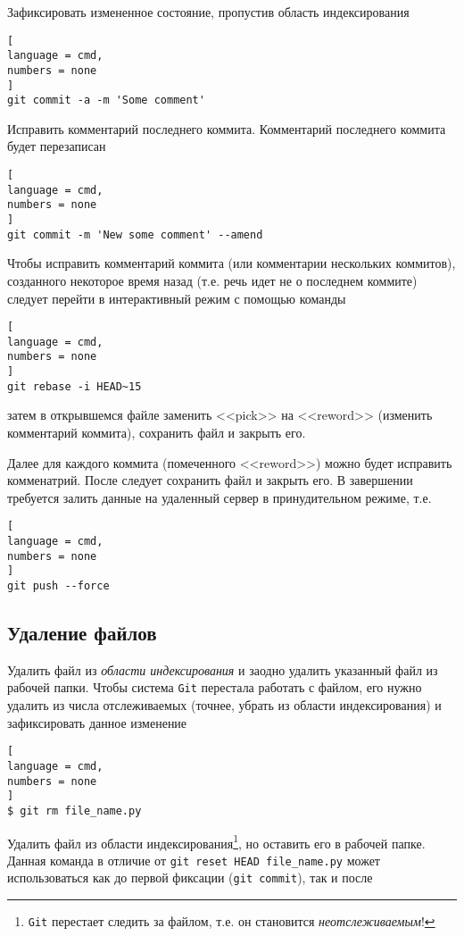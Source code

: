 \documentclass[%
	11pt,
	a4paper,
	utf8,
		]{article}
\begin{document}
Зафиксировать измененное состояние, пропустив область индексирования

\begin{lstlisting}[
language = cmd,
numbers = none
]
git commit -a -m 'Some comment'
\end{lstlisting}

Исправить комментарий последнего коммита. Комментарий последнего коммита будет перезаписан

\begin{lstlisting}[
language = cmd,
numbers = none
]
git commit -m 'New some comment' --amend
\end{lstlisting}

Чтобы исправить комментарий коммита (или комментарии нескольких коммитов), созданного некоторое время назад (т.е. речь идет не о последнем коммите) следует перейти в интерактивный режим с помощью команды

\begin{lstlisting}[
language = cmd,
numbers = none
]
git rebase -i HEAD~15
\end{lstlisting}
затем в открывшемся файле заменить <<pick>> на <<reword>> (изменить комментарий коммита), сохранить файл и закрыть его.

Далее для каждого коммита (помеченного <<reword>>) можно будет исправить комменатрий. После следует сохранить файл и закрыть его. В завершении требуется залить данные на удаленный сервер в принудительном режиме, т.е.
\begin{lstlisting}[
language = cmd,
numbers = none
]
git push --force
\end{lstlisting}


\subsection{Удаление файлов}

Удалить файл из \emph{области индексирования} и заодно удалить указанный файл из рабочей папки. Чтобы система \texttt{Git} перестала работать с файлом, его нужно удалить из числа отслеживаемых (точнее, убрать из области индексирования) и зафиксировать данное изменение 

\begin{lstlisting}[
language = cmd,
numbers = none
]
$ git rm file_name.py
\end{lstlisting}


Удалить файл из области индексирования\footnote{\texttt{Git} перестает следить за файлом, т.е. он становится \emph{неотслеживаемым}!}, но оставить его в рабочей папке. Данная команда в отличие от \texttt{git reset HEAD file\_name.py} может использоваться как до первой фиксации (\texttt{git commit}), так и после
\end{document}

